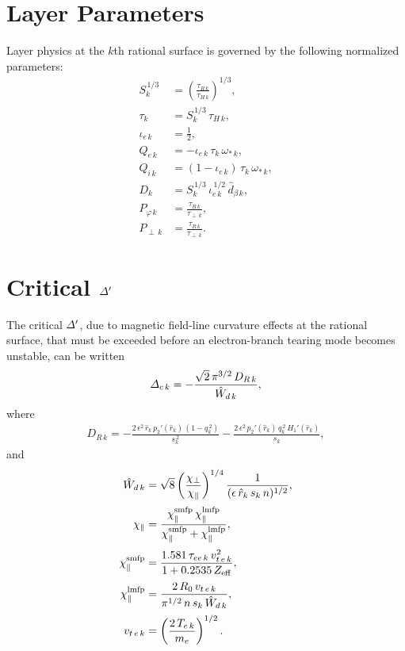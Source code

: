 \documentclass[12pt,prb,aps,notitlepage]{revtex4-1}
\begin{document}
\section{Layer Parameters}
Layer physics at the $k$th rational surface is governed by the following normalized parameters:
\begin{align}
S_k^{\,1/3} &= \left(\frac{\tau_{R\,k}}{\tau_{H\,k}}\right)^{1/3},\\[0.5ex]
\tau_k &= S_k^{\,1/3} \,\tau_{H\,k},\\[0.5ex]
\iota_{e\,k } &= \frac{1}{2},\\[0.5ex]
Q_{e\,k }&= - \iota_{e\,k}\,\tau_k\,\omega_{\ast\,k},\\[0.5ex]
Q_{i\,k }&=  (1-\iota_{e\,k})\,\tau_k\,\omega_{\ast\,k},\\[0.5ex]
D_k &= S_{k}^{\,1/3}\,\iota_{e\,k}^{\,1/2}\,\hat{d}_{\beta\,k},\\[0.5ex]
P_{\varphi\,k} &= \frac{\tau_{R\,k}}{\tau_{\perp\,k}},\\[0.5ex]
P_{\perp\,k} &= \frac{\tau_{R\,k}}{\tau_{\perp\,k}}.
\end{align}

\section{Critical ${\mit\Delta}'$}
The critical ${\mit\Delta}'$, due to magnetic field-line curvature effects at the rational surface, that must be exceeded before an
electron-branch tearing mode becomes unstable, can be written
\begin{align}
{\mit\Delta}_{c\,k} = - \frac{\sqrt{2}\,\pi^{3/2}\,D_{R\,k}}{\hat{W}_{d\,k}},
\end{align}
where
\begin{align}
D_{R\,k} = 
-\frac{2\,\epsilon^2\,\hat{r}_k\,p_2'(\hat{r}_k)\,(1-q_k^{\,2})}{s_k^{\,2}}
- \frac{2\,\epsilon^2\,p_2'(\hat{r}_k)\,q_k^{\,2}\,H_1'(\hat{r}_k)}{s_k},
\end{align}
and
\begin{align}
\hat{W}_{d\,k} &= \sqrt{8}\left(\frac{\chi_\perp}{\chi_\parallel}\right)^{1/4}
\frac{1}{(\epsilon\,\hat{r}_k\,s_k\,n)^{1/2}},\\[0.5ex]
\chi_\parallel &= \frac{\chi_\parallel^{\rm smfp} \,\chi_\parallel^{\rm lmfp}}{\chi_\parallel^{\rm smfp}+\chi_\parallel^{\rm lmfp}},\\[0.5ex]
\chi_\parallel^{\rm smfp} &= \frac{1.581\,\tau_{ee\,k}\,v_{t\,e\,k}^2}{1+ 0.2535\,Z_{\rm eff}},\\[0.5ex]
\chi_\parallel^{\rm lmfp}&= \frac{2\,R_0\,v_{t\,e\,k}}{\pi^{1/2}\,n\,s_k\,\hat{W}_{d\,k}},\\[0.5ex]
v_{t\,e\,k} &= \left(\frac{2\,T_{e\,k}}{m_e}\right)^{1/2}.
\end{align}
\end{document}
